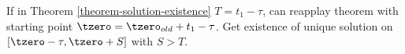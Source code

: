 \begin{corollary}
    \label{cor:continuability-of-solution}

    If in Theorem \ref{theorem-solution-existence} $T=t_1-\tau$, can reapplay theorem with starting point $\tzero=\tzero_{old}+t_1-\tau$. Get existence of unique solution on $[\tzero-\tau,\tzero+S]$ with $S>T$.
\end{corollary}

